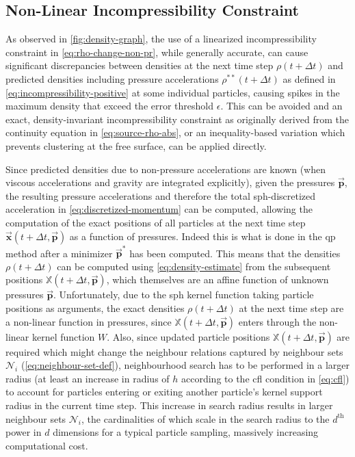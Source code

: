 \documentclass[conference]{IEEEtran}
\newcommand\vek[1]{\vec{\bm{#1}}}
\newcommand\mat[1]{{\mathds{#1}}}
\begin{document}
\subsection{Non-Linear Incompressibility Constraint}\label{sec:nlp-attempt}
As observed in \autoref{fig:density-graph}, the use of a linearized incompressibility constraint in \autoref{eq:rho-change-non-pr}, while generally accurate, can cause significant discrepancies between densities at the next time step $\rho(t + \Delta t)$ and predicted densities including pressure accelerations $\rho^{**}(t+\Delta t)$ as defined in \autoref{eq:incompressibility-positive} at some individual particles, causing spikes in the maximum density that exceed the error threshold $\epsilon$. This can be avoided and an exact, density-invariant incompressibility constraint as originally derived from the continuity equation in \autoref{eq:source-rho-abs}, or an inequality-based variation which prevents clustering at the free surface, can be applied directly. 

Since predicted densities due to non-pressure accelerations are known (when viscous accelerations and gravity are integrated explicitly), given the pressures $\vek{p}$, the resulting pressure accelerations and therefore the total \ac{sph}-discretized acceleration in \autoref{eq:discretized-momentum} can be computed, allowing the computation of the exact positions of all particles at the next time step $\vek{x}(t+\Delta t, \vek{p})$ as a function of pressures. Indeed this is what is done in the \ac{qp} method after a minimizer $\vek{p}^*$ has been computed. This means that the densities $\rho(t+\Delta t)$ can be computed using \autoref{eq:density-estimate} from the subsequent positions $\mat{X}(t+\Delta t, \vek{p})$, which themselves are an affine function of unknown pressures $\vek{p}$. Unfortunately, due to the \ac{sph} kernel function taking particle positions as arguments, the exact densities $\rho(t+\Delta t)$ at the next time step are a non-linear function in pressures, since $\mat{X}(t+\Delta t, \vek{p})$ enters through the non-linear kernel function $W$. Also, since updated particle positions $\mat{X}(t+\Delta t, \vek{p})$ are required which might change the neighbour relations captured by neighbour sets $\mathcal{N}_i$ (\autoref{eq:neighbour-set-def}), neighbourhood search has to be performed in a larger radius (at least an increase in radius of $h$ according to the \ac{cfl} condition in \autoref{eq:cfl}) to account for particles entering or exiting another particle's kernel support radius in the current time step. This increase in search radius results in larger neighbour sets $\mathcal{N}_i$, the cardinalities of which scale in the search radius to the $d^{\text{th}}$ power in $d$ dimensions for a typical particle sampling, massively increasing computational cost. 
\end{document}
